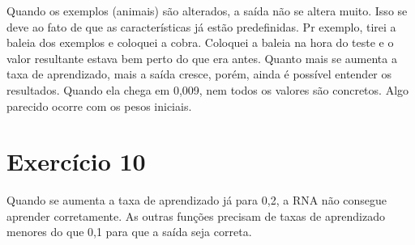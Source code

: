 \documentclass[a4]{article}
\begin{document}
\begin{flushleft}
Quando os exemplos (animais) são alterados, a saída não se altera muito. Isso se deve ao fato de que as características já estão predefinidas. Pr exemplo, tirei a baleia dos exemplos e coloquei a cobra. Coloquei a baleia na hora do teste e o valor resultante estava bem perto do que era antes. Quanto mais se aumenta a taxa de aprendizado, mais a saída cresce, porém, ainda é possível entender os resultados. Quando ela chega em 0,009, nem todos os valores são concretos. Algo parecido ocorre com os pesos iniciais.

\section*{Exercício 10}

Quando se aumenta a taxa de aprendizado já para 0,2, a RNA não consegue aprender corretamente. As outras funções precisam de taxas de aprendizado menores do que 0,1 para que a saída seja correta.

\end{flushleft}
\end{document}
